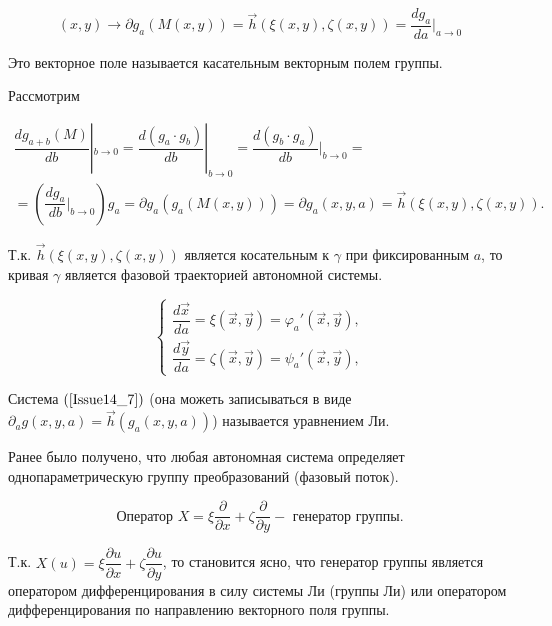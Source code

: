\begin{equation}
	(x,y) \rightarrow \partial g_a(M(x,y)) = \vec{h}(\xi(x,y), \zeta(x,y)) = \dfrac{dg_a}{da}|_{a \rightarrow 0}
	\label{Issue14_6}
\end{equation}

Это векторное поле называется $\textbf{касательным векторным полем}$ группы.

Рассмотрим 

\begin{equation}
	\begin{gathered}
		\dfrac{dg_{a+b}(M)}{db}|_{b\rightarrow 0} = \dfrac{d(g_a\cdot g_b)}{db}|_{b\rightarrow0} = \dfrac{d(g_b\cdot g_a)}{db}|_{b\rightarrow 0} = \\
		= (\dfrac{dg_a}{db}|_{b\rightarrow 0})g_a = \partial g_a (g_a(M(x,y))) = \partial g_a (x,y,a) = \vec{h}(\xi(x,y), \zeta(x,y)).
	\end{gathered}
\end{equation}

Т.к. $\vec{h}(\xi(x,y), \zeta(x,y))$ является косательным к $\gamma$ при фиксированным $a$, то кривая $\gamma$ является $\textbf{фазовой траекторией}$ автономной системы.

\begin{equation}
	\begin{cases}
		\dfrac{d\vec{x}}{da} = \xi(\vec{x}, \vec{y}) = \varphi_a'(\vec{x}, \vec{y}), \\
		\dfrac{d\vec{y}}{da} = \zeta(\vec{x}, \vec{y}) = \psi_a'(\vec{x}, \vec{y}),		
	\end{cases}
	\label{Issue14_7}
\end{equation}

Система $(\ref{Issue14_7})$ (она можеть записываться в виде $\partial_a g(x,y,a) = \vec{h}(g_a(x,y,a))$) называется $\textbf{уравнением Ли}$.

Ранее было получено, что любая автономная система определяет однопараметрическую группу преобразований (фазовый поток).


\begin{equation}
\text{Оператор } X = \xi \dfrac{\partial}{\partial x} + \zeta \dfrac{\partial}{\partial y} - \text{ генератор группы.}
\label{Issue14_8}
\end{equation}

Т.к. $X(u) = \xi \dfrac{\partial u}{\partial x} + \zeta \dfrac{\partial u}{\partial y}$, то становится ясно, что генератор группы является оператором дифференцирования в силу системы Ли (группы Ли) или оператором дифференцирования по направлению векторного поля группы.

